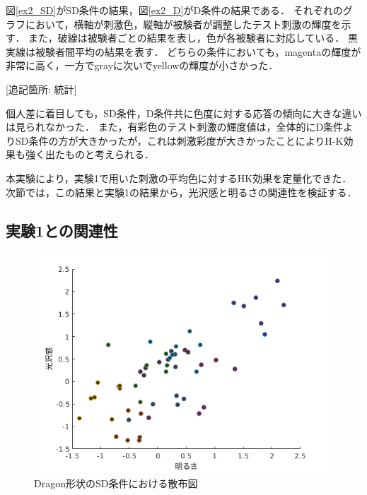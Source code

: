             図\ref{ex2_SD}がSD条件の結果，図\ref{ex2_D}がD条件の結果である．
            それぞれのグラフにおいて，横軸が刺激色，縦軸が被験者が調整したテスト刺激の輝度を示す．
            また，破線は被験者ごとの結果を表し，色が各被験者に対応している．
            黒実線は被験者間平均の結果を表す．
            どちらの条件においても，magentaの輝度が非常に高く，一方でgrayに次いでyellowの輝度が小さかった．

            [追記箇所: 統計]

            個人差に着目しても，SD条件，D条件共に色度に対する応答の傾向に大きな違いは見られなかった．
            また，有彩色のテスト刺激の輝度値は，全体的にD条件よりSD条件の方が大きかったが，これは刺激彩度が大きかったことによりH-K効果も強く出たものと考えられる．

            本実験により，実験1で用いた刺激の平均色に対するHK効果を定量化できた．
            次節では，この結果と実験1の結果から，光沢感と明るさの関連性を検証する．

    \newpage
        \subsection{実験1との関連性}

            \begin{figure}[h]
                \centering
                \includegraphics[width=11.0cm]{./img/ex3_DSD.png}
                \caption{Dragon形状のSD条件における散布図}
                \label{ex3_DSD}
            \end{figure}

